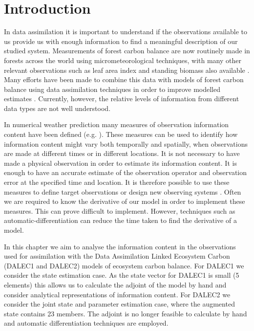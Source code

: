 
\section{Introduction}
In data assimilation it is important to understand if the observations available to us provide us with enough information to find a meaningful description of our studied system. Measurements of forest carbon balance are now routinely made in forests across the world using micrometeorological techniques, with many other relevant observations such as leaf area index and standing biomass also available \citep{baldocchi2008turner}. Many efforts have been made to combine this data with models of forest carbon balance using data assimilation techniques in order to improve modelled estimates \citep{zobitz2011primer, fox2009reflex, richardson2010estimating, Quaife2008, Zobitz2014, Niu2014}. Currently, however, the relative levels of information from different data types are not well understood. 

In numerical weather prediction many measures of observation information content have been defined (e.g. \citet{Cardinali2004, rodgers2000inverse, fisher2003estimation}). These measures can be used to identify how information content might vary both temporally and spatially, when observations are made at different times or in different locations. It is not necessary to have made a physical observation in order to estimate its information content. It is enough to have an accurate estimate of the observation operator and observation error at the specified time and location. It is therefore possible to use these measures to define target observations or design new observing systems \citep{palmer1998singular, eyre1990information}. Often we are required to know the derivative of our model in order to implement these measures. This can prove difficult to implement. However, techniques such as automatic-differentiation \citep{renaud1997automatic} can reduce the time taken to find the derivative of a model.  

In this chapter we aim to analyse the information content in the observations used for assimilation with the Data Assimilation Linked Ecosystem Carbon (DALEC1 and DALEC2) models of ecosystem carbon balance. For DALEC1 we consider the state estimation case. As the state vector for DALEC1 is small (5 elements) this allows us to calculate the adjoint of the model by hand and consider analytical representations of information content. For DALEC2 we consider the joint state and parameter estimation case, where the augmented state contains 23 members. The adjoint is no longer feasible to calculate by hand and automatic differentiation techniques are employed. 

